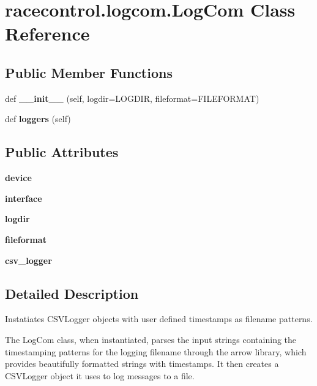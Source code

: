 \section{racecontrol.\+logcom.\+Log\+Com Class Reference}
\label{classracecontrol_1_1logcom_1_1LogCom}
\subsection*{Public Member Functions}
\begin{DoxyCompactItemize}
\item 
def {\bfseries \+\_\+\+\_\+init\+\_\+\+\_\+} (self, logdir=L\+O\+G\+D\+IR, fileformat=F\+I\+L\+E\+F\+O\+R\+M\+AT)\label{classracecontrol_1_1logcom_1_1LogCom_a1b7430f202da41f27eb9d471fecd4cb4}

\item 
def {\bf loggers} (self)
\end{DoxyCompactItemize}
\subsection*{Public Attributes}
\begin{DoxyCompactItemize}
\item 
{\bfseries device}\label{classracecontrol_1_1logcom_1_1LogCom_ae44ae38fb3b18b6cdd7892d771029f86}

\item 
{\bfseries interface}\label{classracecontrol_1_1logcom_1_1LogCom_a29decd0250cfc7548f95b0855b1d1331}

\item 
{\bfseries logdir}\label{classracecontrol_1_1logcom_1_1LogCom_af2d649bd23fb2593cb5043afcd227cc9}

\item 
{\bfseries fileformat}\label{classracecontrol_1_1logcom_1_1LogCom_ada32b5a1e4dbbf4ddd403609146b5524}

\item 
{\bfseries csv\+\_\+logger}\label{classracecontrol_1_1logcom_1_1LogCom_a5ab3a32ec26a4c6be022d3efda81f396}

\end{DoxyCompactItemize}


\subsection{Detailed Description}
\begin{DoxyVerb}Instatiates CSVLogger objects with user defined timestamps as filename
patterns.

The LogCom class, when instantiated, parses the input strings containing
the timestamping patterns for the logging filename through the arrow
library, which provides beautifully formatted strings with timestamps. It
then creates a CSVLogger object it uses to log messages to a file.
\end{DoxyVerb}
 

